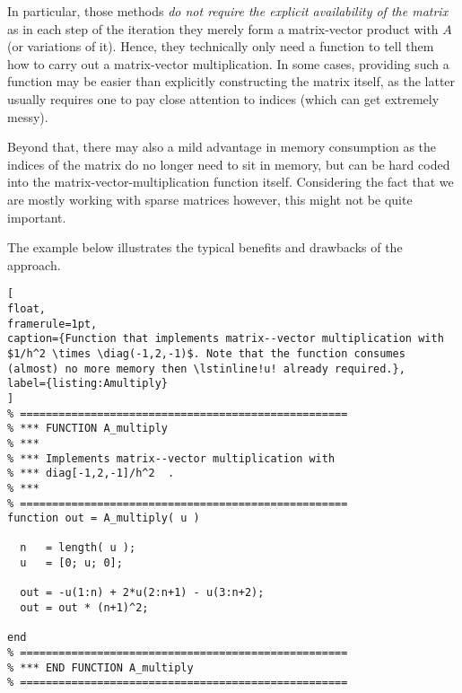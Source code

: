In particular, those methods \emph{do not require the explicit availability of
the matrix} as in each step of the iteration they merely form a matrix-vector
product with $A$ (or variations of it). Hence, they technically only need a
function to tell them how to carry out a matrix-vector multiplication. In some
cases, providing such a function may be easier than explicitly constructing
the matrix itself, as the latter usually requires one to pay close attention
to indices (which can get extremely messy).

Beyond that, there may also a mild advantage in memory consumption as the
indices of the matrix do no longer need to sit in memory, but can be hard coded
into the matrix-vector-multiplication function itself. Considering the fact
that we are mostly working with sparse matrices however, this might not be
quite important.

The example below illustrates the typical benefits and drawbacks of the
approach.

\begin{lstlisting}[
float,
framerule=1pt,
caption={Function that implements matrix--vector multiplication with $1/h^2 \times \diag(-1,2,-1)$. Note that the function consumes (almost) no more memory then \lstinline!u! already required.},
label={listing:Amultiply}
]
% ===================================================
% *** FUNCTION A_multiply
% ***
% *** Implements matrix--vector multiplication with
% *** diag[-1,2,-1]/h^2  .
% ***
% ===================================================
function out = A_multiply( u )

  n   = length( u );
  u   = [0; u; 0];

  out = -u(1:n) + 2*u(2:n+1) - u(3:n+2);
  out = out * (n+1)^2;

end
% ===================================================
% *** END FUNCTION A_multiply
% ===================================================
\end{lstlisting}


